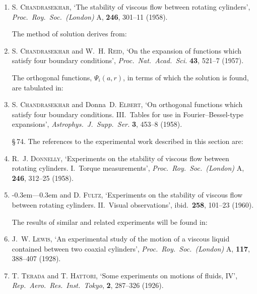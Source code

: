\begin{enumerate}
\medskip
\noindent\S\,72.  The discussion of overstability in this section has not been published before.

\medskip
\noindent\S\,73.  The analysis in this section is based on:

\item S. \textsc{Chandrasekhar}, `The stability of viscous flow between rotating cylin\-ders',
\textit{Proc.\ Roy.\ Soc.\ (London)} A, \textbf{246}, 301--11 (1958).

\noindent The method of solution derives from:

\item S. \textsc{Chandrasekhar} and W.~H. \textsc{Reid}, `On the expansion of functions which
satisfy four boundary conditions', \textit{Proc.\ Nat.\ Acad.\ Sci.} \textbf{43}, 521--7 (1957).

\noindent The orthogonal functions, $\Psi_i(a, r)$, in terms of which the solution is found, are
tabulated in:

\item S. \textsc{Chandrasekhar} and Donna~D. \textsc{Elbert}, `On orthogonal functions
which satisfy four boundary conditions.  III.~Tables for use in Fourier--Bessel-type
expansions', \textit{Astrophys.\ J.\ Supp.\ Ser.} \textbf{3}, 453--8 (1958).

\medskip
\noindent\S\,74.  The references to the experimental work described in this section are:

\item R.~J. \textsc{Donnelly}, `Experiments on the stability of viscous flow between
rotating cylinders.  I.~Torque measurements', \textit{Proc.\ Roy.\ Soc.\ (London)} A,
\textbf{246}, 312--25 (1958).

\item \leavevmode\kern-0.3em---\kern0.3em and D. \textsc{Fultz}, `Experiments on the stability of viscous flow between
rotating cylinders.  II.~Visual observations', ibid.\ \textbf{258}, 101--23 (1960).

\noindent The results of similar and related experiments will be found in:

\item J.~W. \textsc{Lewis}, `An experimental study of the motion of a viscous liquid
contained between two coaxial cylinders', \textit{Proc.\ Roy.\ Soc.\ (London)} A, \textbf{117},
388--407 (1928).

\item T. \textsc{Terada} and T. \textsc{Hattori}, `Some experiments on motions of fluids, IV',
\textit{Rep.\ Aero.\ Res.\ Inst.\ Tokyo}, \textbf{2}, 287--326 (1926).


\end{enumerate}

